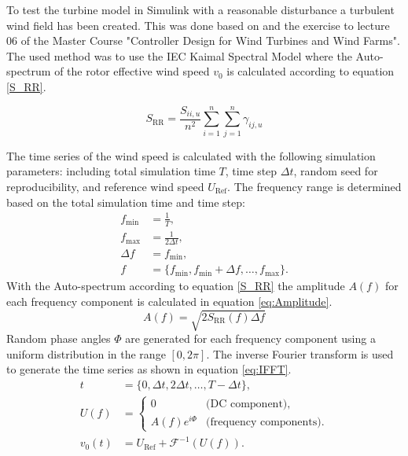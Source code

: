 To test the turbine model in Simulink with a reasonable disturbance a turbulent wind field has been created. This was done based on \cite{IEC61400-1} and the exercise to lecture 06 of the Master Course "Controller Design for Wind Turbines and Wind Farms". \\
The used method was to use the IEC Kaimal Spectral Model \cite{IEC61400-1} where the Auto-spectrum of the rotor effective wind speed $v_0$ is calculated according to equation \ref{S_RR}.

\begin{equation}
	S_{\text{RR}} = \frac{S_{ii,u}}{n^2}\sum_{i=1}^{n}\sum_{j=1}^{n}\gamma_{ij,u}	
	\label{S_RR}
\end{equation}

The time series of the wind speed is calculated with the following simulation parameters: including total simulation time $T$, time step $\Delta t$, random seed for reproducibility, and reference wind speed $U_{\text{Ref}}$. The frequency range is determined based on the total simulation time and time step:
\begin{align*}
	f_{\min} &= \frac{1}{T}, \\
	f_{\max} &= \frac{1}{2\Delta t}, \\
	\Delta f &= f_{\min},\\
	f &= \{f_{\min}, f_{\min} + \Delta f, \ldots, f_{\max}\}.
\end{align*}
With the Auto-spectrum according to equation \ref{S_RR} the amplitude $A(f)$ for each frequency component is calculated in equation \ref{eq:Amplitude}.
\begin{equation}
	A(f) = \sqrt{2 S_{\text{RR}}(f) \Delta f}
	\label{eq:Amplitude}
\end{equation}
Random phase angles $\Phi$ are generated for each frequency component using a uniform distribution in the range $[0, 2\pi]$.
The inverse Fourier transform is used to generate the time series as shown in equation \ref{eq:IFFT}.
\begin{equation}
	\begin{aligned}
		t &= \{0, \Delta t, 2\Delta t, \ldots, T - \Delta t\}, \\
		U(f) &= 
		\begin{cases}
			0 & \text{(DC component)}, \\
			A(f) e^{i\Phi} & \text{(frequency components)}.
		\end{cases} \\
		v_0(t) &= U_{\text{Ref}} + \mathcal{F}^{-1}(U(f)).
	\end{aligned}
	\label{eq:IFFT}
\end{equation}

